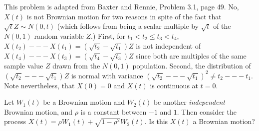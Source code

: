 \begin{solution}
\begin{solution}
\begin{solution}
\begin{solution}
\begin{solution}
\begin{solution}
\begin{solution}
\begin{solution}
\begin{solution}
\begin{solution}
{\begin{solution}
This problem is adapted from Baxter and Rennie, Problem 3.1, page 49.
No, $X(t)$ is not Brownian motion for two reasons in spite of the fact
that $\sqrt{t} Z \sim N(0,t)$ (which follows from being a scalar
multiple by $\sqrt{t}$ of the $N(0,1)$ random variable $Z$.)
First, for $t_1 < t_2 \le t_3 < t_4$, $X(t_2) --- X(t_1) = (\sqrt{t_2} -
\sqrt{t_1})Z$ is not independent of $X(t_4) --- X(t_3) = (\sqrt{t_4} -
\sqrt{t_3})Z$ since both are multiples of the same sample value $Z$
drawn from the $N(0,1)$ population.
Second, the distribution of $(\sqrt{t_2} --- \sqrt{t_1})Z$ is normal
with variance $(\sqrt{t_2} --- \sqrt{t_1})^2 \ne t_2 --- t_1$.
Note nevertheless, that $X(0) = 0$ and $X(t)$ is continuous at $t=0$.  
\end{solution}

\begin{problem}
 Let $W_1(t)$ be a Brownian motion and $W_2(t)$ be another
  \emph{independent} Brownian motion, and $\rho$ is a constant between
  $-1$ and $1$.  Then consider the process $X(t) = \rho W_1(t) +
  \sqrt{1-\rho^2} W_2(t)$.  Is this $X(t)$ a Brownian motion? 
\end{problem} 
\begin{solution} 


\end{solution}}
\end{solution}
\end{solution}
\end{solution}
\end{solution}
\end{solution}
\end{solution}
\end{solution}
\end{solution}
\end{solution}
\end{solution}
